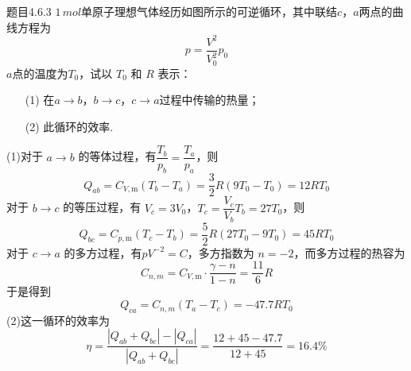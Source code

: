 \begin{question}{题目4.6.3}
    $1\,\si{mol}$单原子理想气体经历如图所示的可逆循环，其中联结$c$，$a$两点的曲线方程为
    $$
        p=\frac{V^2}{V_0^2}p_0
    $$
    $a$点的温度为$T_0$，试以 $T_0$ 和 $R$ 表示：
    \begin{enumerate}
        \item [(1)] 在$a \to b$，$b \to c$，$c \to a$过程中传输的热量；
        \item [(2)] 此循环的效率.
    \end{enumerate}
    \begin{center}
    \end{center}
\end{question}
\begin{solution}
    (1)对于 $a \to b$ 的等体过程，有$\dfrac{T_b}{p_b} = \dfrac{T_a}{p_a}$，则
    $$
        Q_{ab} = C_{V,\mathrm{m}}(T_b - T_a) = \frac{3}{2}R(9T_0 - T_0) = 12RT_0
    $$
    对于 $b \to c$ 的等压过程，有 $V_c = 3V_0$，$T_c = \dfrac{V_c}{V_b}T_b = 27T_0$，则
    $$
        Q_{bc} = C_{p,\mathrm{m}}(T_c - T_b) = \frac{5}{2}R(27T_0 - 9T_0) = 45RT_0
    $$
    对于 $c \to a$ 的多方过程，有$pV^{-2} = C$，多方指数为 $n=-2$，而多方过程的热容为
    $$
        C_{n,m} = C_{V,\mathrm{m}} \cdot \frac{\gamma - n}{1 - n} = \frac{11}{6}R
    $$
    于是得到
    $$
        Q_{ca} = C_{n,m}(T_a - T_c) = -47.7RT_0
    $$
    (2)这一循环的效率为
    $$
        \eta
        = \frac{|Q_{ab} + Q_{bc}| - |Q_{ca}|}{|Q_{ab} + Q_{bc}|}
        = \frac{12+45-47.7}{12+45}
        = 16.4\%
    $$
\end{solution}

